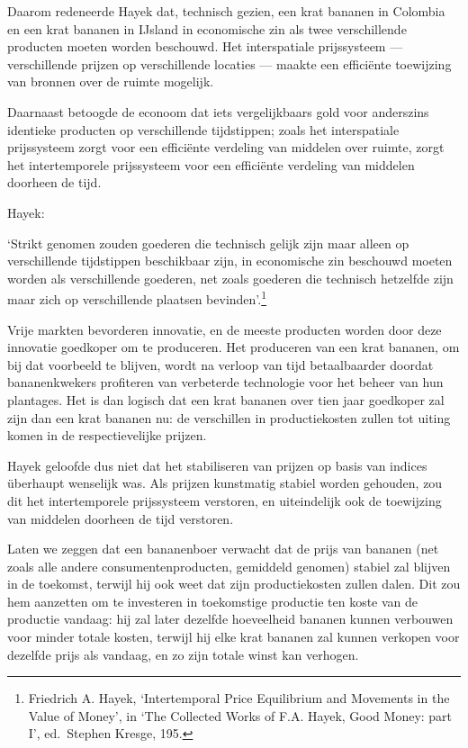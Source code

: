 \documentclass[
  a5paper,
  smalldemyvopaper,11pt,twoside,onecolumn,openright,extrafontsizes]{memoir}
\begin{document}
Daarom redeneerde Hayek dat, technisch gezien, een krat bananen in
Colombia en een krat bananen in IJsland in economische zin als twee
verschillende producten moeten worden beschouwd. Het interspatiale
prijssysteem --- verschillende prijzen op verschillende locaties ---
maakte een efficiënte toewijzing van bronnen over de ruimte mogelijk.

Daarnaast betoogde de econoom dat iets vergelijkbaars gold voor
anderszins identieke producten op verschillende tijdstippen; zoals het
interspatiale prijssysteem zorgt voor een efficiënte verdeling van
middelen over ruimte, zorgt het intertemporele prijssysteem voor een
efficiënte verdeling van middelen doorheen de tijd.

Hayek:

`Strikt genomen zouden goederen die technisch gelijk zijn maar alleen op
verschillende tijdstippen beschikbaar zijn, in economische zin beschouwd
moeten worden als verschillende goederen, net zoals goederen die
technisch hetzelfde zijn maar zich op verschillende plaatsen
bevinden'.\footnote{\hspace{0pt}Friedrich A. Hayek, `Intertemporal Price
  Equilibrium and Movements in the Value of Money', in `The Collected
  Works of F.A. Hayek, Good Money: part I', ed.~Stephen Kresge, 195.}

Vrije markten bevorderen innovatie, en de meeste producten worden door
deze innovatie goedkoper om te produceren. Het produceren van een krat
bananen, om bij dat voorbeeld te blijven, wordt na verloop van tijd
betaalbaarder doordat bananenkwekers profiteren van verbeterde
technologie voor het beheer van hun plantages. Het is dan logisch dat
een krat bananen over tien jaar goedkoper zal zijn dan een krat bananen
nu: de verschillen in productiekosten zullen tot uiting komen in de
respectievelijke prijzen.

Hayek geloofde dus niet dat het stabiliseren van prijzen op basis van
indices überhaupt wenselijk was. Als prijzen kunstmatig stabiel worden
gehouden, zou dit het intertemporele prijssysteem verstoren, en
uiteindelijk ook de toewijzing van middelen doorheen de tijd verstoren.

Laten we zeggen dat een bananenboer verwacht dat de prijs van bananen
(net zoals alle andere consumentenproducten, gemiddeld genomen) stabiel
zal blijven in de toekomst, terwijl hij ook weet dat zijn
productiekosten zullen dalen. Dit zou hem aanzetten om te investeren in
toekomstige productie ten koste van de productie vandaag: hij zal later
dezelfde hoeveelheid bananen kunnen verbouwen voor minder totale kosten,
terwijl hij elke krat bananen zal kunnen verkopen voor dezelfde prijs
als vandaag, en zo zijn totale winst kan verhogen.
\end{document}

